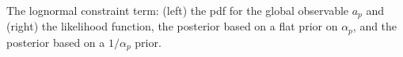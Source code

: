 The lognormal constraint term: (left) the pdf for the global observable $a_p$ and (right) the likelihood function, the posterior based on a flat prior on $\alpha_p$, and the posterior based on a $1/\alpha_p$ prior.